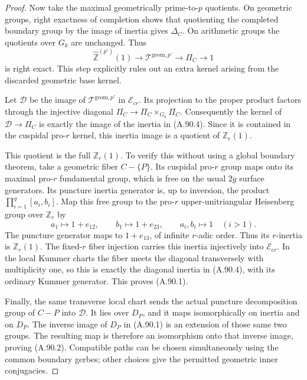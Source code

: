 \documentclass[11pt]{article}
\begin{document}
\begin{proof}
Now take the maximal geometrically prime-to-\(p\)
quotients. On geometric groups, right exactness of
completion shows that quotienting the completed
boundary group by the image of inertia gives
\(\Delta_C\). On arithmetic groups the quotients
over \(G_k\) are unchanged. Thus
\[
 \widehat{\mathbb Z}^{(p')}(1)\longrightarrow
 \mathcal T^{\mathrm{geom},p'}\longrightarrow
 \Pi_C\longrightarrow1                             \tag{A.90.4}
\]
is right exact. This step explicitly rules out an extra
kernel arising from the discarded geometric base kernel.

Let \(\mathcal D\) be the image of
\(\mathcal T^{\mathrm{geom},p'}\) in
\(\mathcal E_{\mathrm{c}r}\). Its projection to the
proper product factors through the injective diagonal
\(\Pi_C\to\Pi_C\times_{G_k}\Pi_C\).
Consequently the kernel of \(\mathcal D\to\Pi_C\)
is exactly the image of the inertia in (A.90.4).
Since it is contained in the cuspidal pro-\(r\) kernel,
this inertia image is a quotient of \(\mathbb Z_r(1)\).

This quotient is the full \(\mathbb Z_r(1)\).
To verify this without using a global boundary theorem,
take a geometric fiber \(C-\{P\}\). Its cuspidal
pro-\(r\) group maps onto its maximal pro-\(r\)
fundamental group, which is free on the usual
\(2g\) surface generators. Its puncture inertia
generator is, up to inversion, the product
\(\prod_{i=1}^g[a_i,b_i]\). Map this free group to
the pro-\(r\) upper-unitriangular Heisenberg group
over \(\mathbb Z_r\) by
\[
 a_1\longmapsto 1+e_{12},\qquad
 b_1\longmapsto 1+e_{23},\qquad
 a_i,b_i\longmapsto1\quad(i>1).
                                                        \tag{A.90.5}
\]
The puncture generator maps to \(1+e_{13}\), of
infinite \(r\)-adic order. Thus its \(r\)-inertia
is \(\mathbb Z_r(1)\). The fixed-\(r\) fiber
injection carries this inertia injectively into
\(\mathcal E_{\mathrm{c}r}\). In the local Kummer
charts the fiber meets the diagonal transversely
with multiplicity one, so this is exactly the
diagonal inertia in (A.90.4), with its ordinary
Kummer generator. This proves (A.90.1).

Finally, the same transverse local chart sends the
actual puncture decomposition group of \(C-P\)
into \(\mathcal D\). It lies over \(D_P\), and
it maps isomorphically on inertia and on \(D_P\).
The inverse image of \(D_P\) in (A.90.1) is an
extension of those same two groups. The resulting
map is therefore an isomorphism onto that inverse
image, proving (A.90.2). Compatible paths can be chosen
simultaneously using the common boundary gerbes;
other choices give the permitted geometric inner
conjugacies.


\end{proof}
\end{document}
